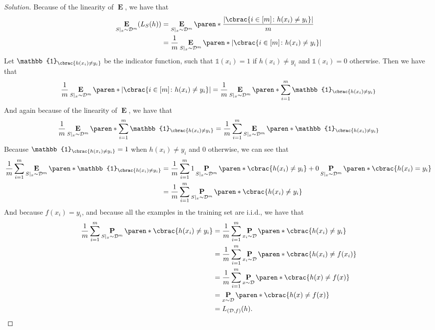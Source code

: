 \documentclass[10pt, a4paper, twoside]{amsart}
\DeclarePairedDelimiter\abs{\lvert}{\rvert}
\DeclarePairedDelimiter\cbrac\{\}
\DeclarePairedDelimiter\paren()
\renewcommand{\c}{\ensuremath{\colon}}
\newcommand{\Ind}{\ensuremath{\mathbb{1}}}
\renewcommand{\P}{\operatorname*{\ensuremath{\mathbf{P}}}}
\newcommand{\Ev}{\operatorname*{\ensuremath{\mathbf{E}}}}
\newenvironment{solution}
               {\let\oldqedsymbol=\qedsymbol
                \renewcommand{\qedsymbol}{$\blacktriangleleft$}
                \begin{proof}[Solution]}
               {\end{proof}
                \renewcommand{\qedsymbol}{\oldqedsymbol}}
\begin{document}
\begin{solution}
Because of the linearity of $\Ev$, we have that
\begin{align*}
 \Ev\limits_{S|_x \sim \mathcal{D}^m}(L_{S}(h)) 
 &=\Ev\limits_{S|_x \sim \mathcal{D}^m}\paren*{\frac{\abs{\cbrac{i\in [m] \c h(x_i) \neq y_i}}}{m}} \\
  &=\frac{1}{m}\Ev\limits_{S|_x \sim \mathcal{D}^m}\paren*{\abs{\cbrac{i\in [m] \c h(x_i) \neq y_i}}} \\
\end{align*}
Let $\Ind_{\cbrac{h(x_i)\neq y_i }}$ be the indicator function, such that $\Ind(x_i) = 1$ if $h(x_i)\neq y_i$ and $\Ind(x_i) = 0$ otherwise. Then we have that
\begin{equation*}
  \frac{1}{m}\Ev\limits_{S|_x \sim \mathcal{D}^m}\paren*{\abs{\cbrac{i\in [m] \c h(x_i) \neq y_i}}} = \frac{1}{m}\Ev\limits_{S|_x \sim \mathcal{D}^m}\paren*{\sum_{i=1}^m \Ind_{\cbrac{h(x_i)\neq y_i}}} \\
\end{equation*}
And again because of the linearity of $\Ev$, we have that
\begin{equation*}
  \frac{1}{m}\Ev\limits_{S|_x \sim \mathcal{D}^m}\paren*{\sum_{i=1}^m \Ind_{\cbrac{h(x_i)\neq y_i}}}
  =\frac{1}{m}\sum_{i=1}^m \Ev\limits_{S|_x \sim \mathcal{D}^m}\paren*{\Ind_{\cbrac{h(x_i)\neq y_i}}}
\end{equation*}
Because $\Ind_{\cbrac{h(x_i)\neq y_i}} = 1$ when  $h(x_i)\neq y_i$ and $0$ otherwise, we can see that 
\begin{align*}
 \frac{1}{m}\sum_{i=1}^m \Ev\limits_{S|_x \sim \mathcal{D}^m}\paren*{\Ind_{\cbrac{h(x_i)\neq y_i}}}
  &=\frac{1}{m}\sum_{i=1}^m 1\P\limits_{S|_x \sim \mathcal{D}^m}\paren*{\cbrac{h(x_i)\neq y_i}} +0 \P\limits_{S|_x \sim \mathcal{D}^m}\paren*{\cbrac{h(x_i)= y_i}} \\
  &=\frac{1}{m}\sum_{i=1}^m \P\limits_{S|_x \sim \mathcal{D}^m}\paren*{\cbrac{h(x_i)\neq y_i}}
\end{align*}
And because $f(x_i) = y_i$, and because all the examples in the training set are i.i.d., we have that
\begin{align*}
  \frac{1}{m}\sum_{i=1}^m \P\limits_{S|_x \sim \mathcal{D}^m}\paren*{\cbrac{h(x_i)\neq y_i}}
 &=\frac{1}{m}\sum_{i=1}^m \P\limits_{x_i \sim \mathcal{D}}\paren*{\cbrac{h(x_i)\neq y_i}} \\
 &=\frac{1}{m}\sum_{i=1}^m \P\limits_{x_i \sim \mathcal{D}}\paren*{\cbrac{h(x_i)\neq f(x_i)}} \\
 &=\frac{1}{m}\sum_{i=1}^m \P\limits_{x \sim \mathcal{D}}\paren*{\cbrac{h(x)\neq f(x)}} \\
 &=\P\limits_{x \sim \mathcal{D}}\paren*{\cbrac{h(x)\neq f(x)}} \\
 &=L_{(\mathcal{D},f)}(h).
\end{align*}



\end{solution}
\end{document}
